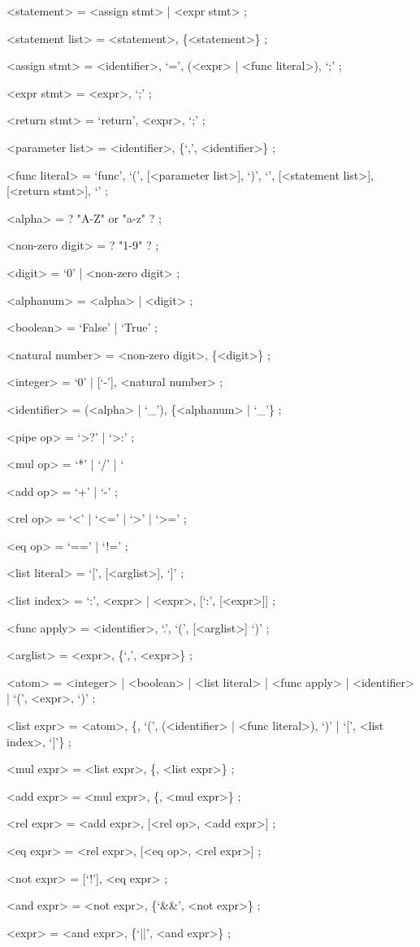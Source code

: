 \documentclass{article}
\begin{document}
	\begin{grammar}
		<statement> = <assign stmt> | <expr stmt> ;

		<statement list> = <statement>, \{<statement>\} ;

		<assign stmt> = <identifier>, `=', (<expr> | <func literal>), `;' ;

		<expr stmt> = <expr>, `;' ;

		<return stmt> = `return', <expr>, `;' ;

		<parameter list> = <identifier>, \{`,', <identifier>\} ;

		<func literal> = `func', `(', [<parameter list>], `)',
						`{', [<statement list>], [<return stmt>], `}' ;
	\end{grammar}
	\begin{grammar}
		<alpha> = ? "A-Z" or "a-z" ? ;

		<non-zero digit> = ? "1-9" ? ;

		<digit> = `0' | <non-zero digit> ;

		<alphanum> = <alpha> | <digit> ;

		<boolean> = `False' | `True' ;

		<natural number> = <non-zero digit>, \{<digit>\} ;

		<integer> = `0' | [`-'], <natural number> ;

		<identifier> = (<alpha> | `_'), \{<alphanum> | `_'\} ;

		<pipe op> = `>?' | `>:' ;

		<mul op> = `*' | `/' | `%

		<add op> = `+' | `-' ;

		<rel op> = `<' | `<=' | `>' | `>=' ;

		<eq op> = `==' | `!=' ;
	\end{grammar}
	\begin{grammar}
		<list literal> = `[', [<arglist>], `]' ;

		<list index> = `:', <expr> | <expr>, [`:', [<expr>]] ;

		<func apply> = <identifier>, `.', `(', [<arglist>] `)' ;

		<arglist> = <expr>, \{`,', <expr>\} ;

		<atom> = <integer> | <boolean> | <list literal>
				 | <func apply> | <identifier> | `(', <expr>, `)' ;
	\end{grammar}
	\begin{grammar}
		<list expr> = <atom>, \{<pipe op>,
					  `(', (<identifier> | <func literal>), `)'
					  | `[', <list index>, `]'\} ;

		<mul expr> = <list expr>, \{<mul op>, <list expr>\} ;

		<add expr> = <mul expr>, \{<add op>, <mul expr>\} ;

		<rel expr> = <add expr>, [<rel op>, <add expr>] ;

		<eq expr> = <rel expr>, [<eq op>, <rel expr>] ;

		<not expr> = [`!'], <eq expr> ;

		<and expr> = <not expr>, \{`&&', <not expr>\} ;

		<expr> = <and expr>, \{`||', <and expr>\} ;
	\end{grammar}
\end{document}
